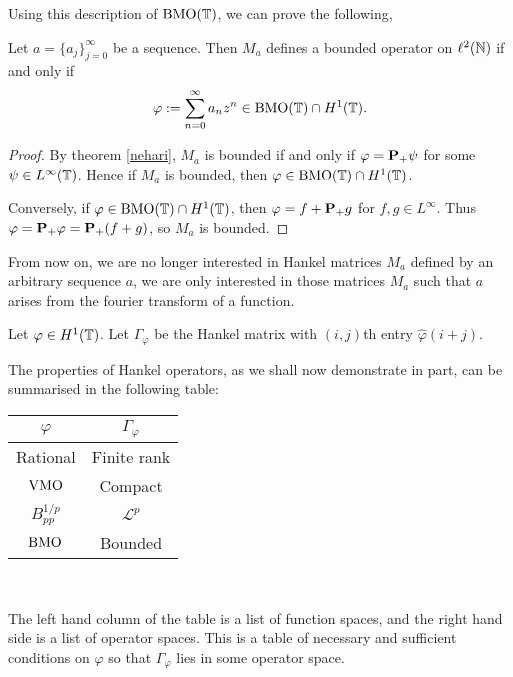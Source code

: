 Using this description of $\operatorname{BMO}(\mathbb{T})$, we can prove the following,
\begin{corollary}
    Let $a = \{a_j\}_{j=0}^\infty$ be a sequence. Then $M_a$ defines
    a bounded operator on $\ell^2(\mathbb{N})$ if and only if
    \begin{equation*}
        \varphi := \sum_{n=0}^\infty a_n z^n \in \operatorname{BMO}(\mathbb{T})\cap H^1(\mathbb{T}).
    \end{equation*}
\end{corollary}
\begin{proof}
    By theorem \ref{nehari}, $M_a$ is bounded if and only if $\varphi = \mathbf{P}_+\psi$
    for some $\psi \in L^\infty(\mathbb{T})$. Hence if $M_a$ is bounded,
    then $\varphi \in \operatorname{BMO}(\mathbb{T})\cap H^1(\mathbb{T})$. 
    
    Conversely, if $\varphi \in \operatorname{BMO}(\mathbb{T})\cap H^1(\mathbb{T})$,
    then $\varphi = f+\mathbf{P}_+g$ for $f,g \in L^\infty$. Thus
    $\varphi = \mathbf{P}_+\varphi = \mathbf{P}_+(f+g)$, so $M_a$ is bounded.
\end{proof}

From now on, we are no longer interested in Hankel matrices $M_a$ defined by an arbitrary
sequence $a$, we are only interested in those matrices $M_a$ such that $a$
arises from the fourier transform of a function. 
\begin{definition}
    Let $\varphi \in H^1(\mathbb{T})$. Let $\Gamma_\varphi$
    be the Hankel matrix with $(i,j)$th entry $\hat{\varphi}(i+j)$.
\end{definition}

The properties of Hankel operators, as we shall now demonstrate in part, can be summarised
in the following table: \\
\begin{center}
\begin{tabular}{|c|c|}
\hline
$\varphi$ & $\Gamma_\varphi$\\
\hline
Rational & Finite rank\\
$\operatorname{VMO}$ & Compact\\
$B_{pp}^{1/p}$ & $\mathcal{L}^p$\\
$\operatorname{BMO}$ & Bounded\\
\hline
\end{tabular}\\
\end{center}
The left hand column of the table is a list of function spaces,
and the right hand side is a list of operator spaces. This is a table
of necessary and sufficient conditions on $\varphi$ so that $\Gamma_\varphi$
lies in some operator space.

